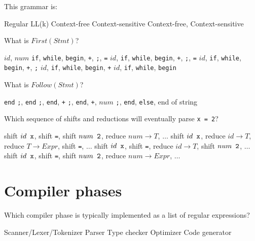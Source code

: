 \documentclass[addpoints]{exam}
\begin{document}
\begin{questions}
\question This grammar is:

\begin{oneparchoices}
\choice Regular
\choice LL(k)
\choice Context-free
\choice Context-sensitive
\choice Context-free, Context-sensitive
\end{oneparchoices}

\answerline

\question What is $First(Stmt)$?

\begin{choices}
\choice $id$, $num$ \verb+if+, \verb+while+, \verb+begin+, \verb|+|, \verb+;+, \verb+=+
\choice $id$, \verb+if+, \verb+while+, \verb+begin+, \verb|+|, \verb+;+, \verb+=+
\choice $id$, \verb+if+, \verb+while+, \verb+begin+, \verb|+|, \verb+;+
\choice $id$, \verb+if+, \verb+while+, \verb+begin+, \verb|+|
\choice $id$, \verb+if+, \verb+while+, \verb+begin+
\end{choices}

\answerline

\question What is $Follow(Stmt)$?

\begin{choices}
\choice \verb+end+
\choice \verb+;+, \verb+end+
\choice \verb+;+, \verb+end+, \verb|+|
\choice \verb+;+, \verb+end+, \verb|+|, $num$
\choice \verb+;+, \verb+end+, \verb+else+, end of string
\end{choices}

\answerline

\question Which sequence of shifts and reductions will eventually parse \verb+x = 2+?

\begin{choices}
\choice shift $id \verb+ x+$, shift \verb+=+, shift $num \verb+ 2+$, reduce $num \to T$, $\ldots$
\choice shift $id \verb+ x+$, reduce $id \to T$, reduce $T \to Expr$, shift \verb+=+, $\ldots$
\choice shift $id \verb+ x+$, shift \verb+=+, reduce $id \to T$, shift $num \verb+ 2+$, $\ldots$
\choice shift $id \verb+ x+$, shift \verb+=+, shift $num \verb+ 2+$, reduce $num \to Expr$, $\ldots$
\end{choices}

\answerline
\pagebreak

\section{Compiler phases}

\question Which compiler phase is typically implemented as a list of regular expressions?

\begin{oneparchoices}
\choice Scanner/Lexer/Tokenizer
\choice Parser
\choice Type checker
\choice Optimizer
\choice Code generator
\end{oneparchoices}


\end{questions}
\end{document}
